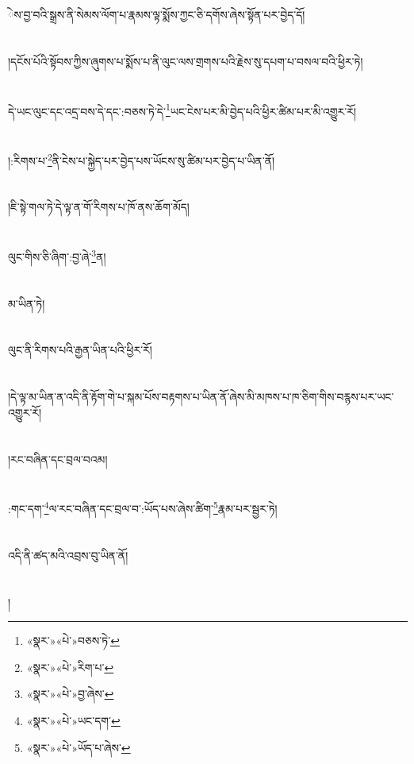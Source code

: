 ེས་བྱ་བའི་སྒྲས་ནི་སེམས་ལོག་པ་རྣམས་ལྟ་སྨོས་ཀྱང་ཅི་དགོས་ཞེས་སྟོན་པར་བྱེད་དོ།\chapter{ }།དངོས་པོའི་སྟོབས་ཀྱིས་ཞུགས་པ་སྨོས་པ་ནི་ལུང་ལས་གྲགས་པའི་རྗེས་སུ་དཔག་པ་བསལ་བའི་ཕྱིར་ཏེ།\chapter{ }དེ་ཡང་ལུང་དང་འདྲ་བས་དེ་དང་:བཅས་ཏེ་དེ་\footnote{«སྣར་»«པེ་»བཅས་ཏེ་}ཡང་ངེས་པར་མི་བྱེད་པའི་ཕྱིར་ཚིམ་པར་མི་འགྱུར་རོ།\chapter{ }།:རིགས་པ་\footnote{«སྣར་»«པེ་»རིག་པ་}ནི་ངེས་པ་སྐྱེད་པར་བྱེད་པས་ཡོངས་སུ་ཚིམ་པར་བྱེད་པ་ཡིན་ནོ།\chapter{ }།ཇི་སྟེ་གལ་ཏེ་དེ་ལྟ་ན་གོ་རིགས་པ་ཁོ་ནས་ཆོག་མོད།\chapter{ }ལུང་གིས་ཅི་ཞིག་:བྱ་ཞེ་\footnote{«སྣར་»«པེ་»བྱ་ཞེས་}ན།\chapter{ }མ་ཡིན་ཏེ།\chapter{ }ལུང་ནི་རིགས་པའི་རྒྱན་ཡིན་པའི་ཕྱིར་རོ།\chapter{ }།དེ་ལྟ་མ་ཡིན་ན་འདི་ནི་རྟོག་གེ་པ་སྐམ་པོས་བརྟགས་པ་ཡིན་ནོ་ཞེས་མི་མཁས་པ་ཁ་ཅིག་གིས་བརྙས་པར་ཡང་འགྱུར་རོ།\chapter{ }།རང་བཞིན་དང་བྲལ་བའམ།\chapter{ }:གང་དག་\footnote{«སྣར་»«པེ་»ཡང་དག་}ལ་རང་བཞིན་དང་བྲལ་བ་:ཡོད་པས་ཞེས་ཚིག་\footnote{«སྣར་»«པེ་»ཡོད་པ་ཞེས་}རྣམ་པར་སྦྱར་ཏེ།\chapter{ }འདི་ནི་ཚད་མའི་འབྲས་བུ་ཡིན་ནོ།\chapter{ }།
